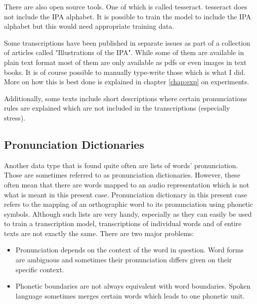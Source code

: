 There are also open source tools. One of which is called tesseract. tesseract does not include the IPA alphabet. It is possible to train the model to include the IPA alphabet but this would need appropriate training data. 

Some transcriptions have been published in separate issues as part of a collection of articles called "Illustrations of the IPA". While some of them are available in plain text format most of them are only available as pdfs or even images in text books. It is of course possible to manually type-write those which is what I did. More on how this is best done is explained in chapter \ref{chap:exp} on experiments.

Additionally, some texts include short descriptions where certain pronunciations rules are explained which are not included in the transcriptions (especially stress). 

\subsection{Pronunciation Dictionaries}
Another data type that is found quite often are lists of words' pronunciation. Those are sometimes referred to as pronunciation dictionaries. However, these often mean that there are words mapped to an audio representation which is not what is meant in this present case. Pronunciation dictionary in this present case refers to the mapping of an orthographic word to its pronunciation using phonetic symbols. Although such lists are very handy, especially as they can easily be used to train a transcription model, transcriptions of individual words and of entire texts are not exactly the same. There are two major problems:

\begin{itemize}
\item Pronunciation depends on the context of the word in question. Word forms are ambiguous and sometimes their pronunciation differs given on their specific context.  
\item Phonetic boundaries are not always equivalent with word boundaries. Spoken language sometimes merges certain words which leads to one phonetic unit. 
\end{itemize} 


